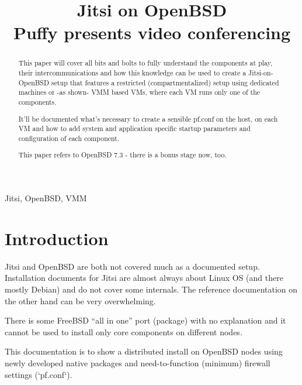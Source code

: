 \documentclass[10pt,conference]{IEEEtran}
\begin{document}
\title{Jitsi on OpenBSD\\
{\Large Puffy presents video conferencing}
}

\author{

}

\maketitle

\begin{abstract}
This paper will cover all bits and bolts to fully understand the components
at play, their intercommunications and how this knowledge can be used to create
a Jitsi-on-OpenBSD setup that features a restricted (compartmentalized) setup using
dedicated machines or -as shown- VMM based VMs, where each VM runs only one of the
components.

\bigskip
It'll be documented what's necessary to create a sensible pf.conf on the host, on each VM
and how to add system and application specific startup parameters and configuration of
each component.

\bigskip
This paper refers to OpenBSD 7.3 - there is a bonus stage now, too.

\bigskip
\end{abstract}

\begin{IEEEkeywords}
Jitsi, OpenBSD, VMM
\end{IEEEkeywords}

\section{Introduction}
Jitsi and OpenBSD are both not covered much as a documented setup. Installation documents
for Jitsi are almost always about Linux OS (and there mostly Debian) and do not cover
some internals. The reference documentation on the other hand can be very overwhelming.

There is some FreeBSD ``all in one'' port (package) with no explanation and it cannot be
used to install only core components on different nodes.

This documentation is to show a distributed install on OpenBSD nodes using newly developed
native packages and need-to-function (minimum) firewall settings (`pf.conf`).
\end{document}
